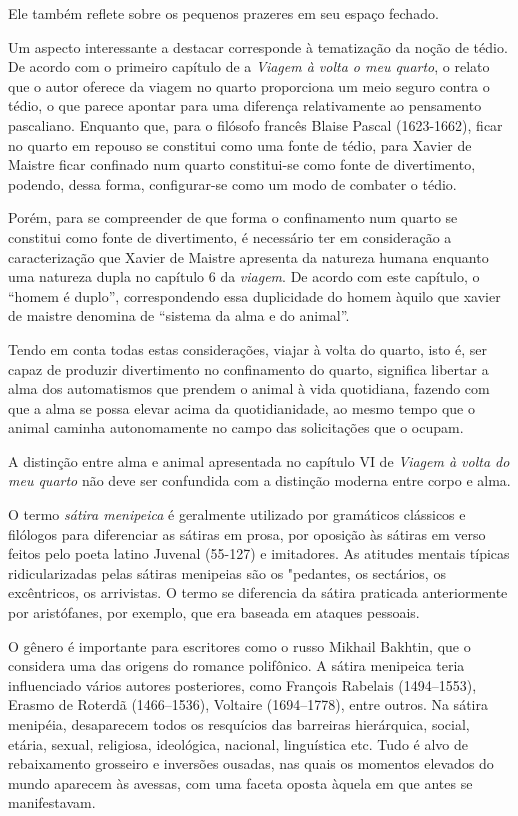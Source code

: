 \documentclass[12pt]{extarticle}
\begin{document}
Ele também reflete sobre os pequenos prazeres em seu espaço fechado.

Um aspecto interessante a destacar corresponde à tematização da noção de tédio. De acordo com o primeiro capítulo de a \textit{Viagem à volta o meu quarto}, o relato que o autor oferece da viagem no quarto proporciona um meio seguro contra o tédio, o que parece apontar para uma diferença relativamente ao pensamento pascaliano. Enquanto que, para o filósofo francês Blaise Pascal (1623-1662), ficar no quarto em repouso se constitui como uma fonte de tédio, para Xavier de Maistre ficar confinado num quarto constitui-se como fonte de divertimento, 
podendo, dessa forma, configurar-se como um modo de combater o tédio. 

Porém, para se compreender de que forma o confinamento num quarto se constitui como fonte de divertimento, é necessário ter em consideração a caracterização que Xavier de Maistre apresenta da natureza humana enquanto uma natureza dupla no capítulo 6 da \textit{viagem}. De acordo com este capítulo, o ``homem é duplo'', correspondendo essa duplicidade do homem àquilo que xavier de maistre denomina de ``sistema da alma e do animal''. 

Tendo em conta todas estas considerações, viajar à volta do quarto, isto é, ser capaz de produzir divertimento no confinamento do quarto, significa libertar a alma dos
automatismos que prendem o animal à vida quotidiana, fazendo com que a alma se
possa elevar acima da quotidianidade, ao mesmo tempo que o animal caminha autonomamente no campo das solicitações que o ocupam.

A distinção entre alma e animal apresentada no capítulo VI de \textit{Viagem à volta do meu quarto} 
não deve ser confundida com a distinção moderna entre corpo e alma. 

O termo \textit{sátira menipeica} é geralmente utilizado por gramáticos clássicos e filólogos 
para diferenciar as sátiras em prosa, por oposição às sátiras em verso feitos pelo poeta 
latino Juvenal (55-127) e imitadores. As atitudes mentais típicas ridicularizadas pelas sátiras menipeias são os "pedantes, os sectários, os excêntricos, os arrivistas. O termo se diferencia da sátira praticada anteriormente por aristófanes, por exemplo, que era baseada em ataques pessoais. 

O gênero é importante para escritores como o russo Mikhail Bakhtin, que o considera uma das origens do romance polifônico.  A sátira menipeica teria influenciado vários autores posteriores, como 
François Rabelais (1494--1553), 
Erasmo de Roterdã (1466--1536), 
Voltaire (1694--1778), entre outros.
Na sátira menipéia, desaparecem todos os resquícios das barreiras hierárquica, social, etária, sexual, religiosa, ideológica, nacional, linguística etc. Tudo é alvo de rebaixamento grosseiro e inversões ousadas, nas quais os momentos elevados do mundo aparecem às avessas, com uma faceta oposta àquela em que antes se manifestavam.
\end{document}
